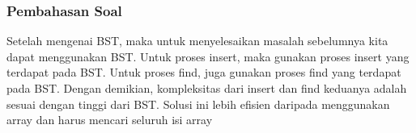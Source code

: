 \begin{frame}
\frametitle{Pembahasan Soal}

Setelah mengenai BST, maka untuk menyelesaikan masalah sebelumnya kita dapat menggunakan BST. Untuk proses insert, maka gunakan proses insert yang terdapat pada BST. Untuk proses find, juga gunakan proses find yang terdapat pada BST.
\newline\newline
Dengan demikian, kompleksitas dari insert dan find keduanya adalah sesuai dengan tinggi dari BST. Solusi ini lebih efisien daripada menggunakan array dan harus mencari seluruh isi array
\end{frame}




